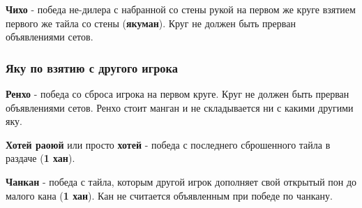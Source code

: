 \textbf{Чихо} - победа не-дилера с набранной со стены рукой на первом же круге взятием первого же тайла со стены (\textbf{якуман}). Круг не должен быть прерван объявлениями сетов.

\subsubsection{Яку по взятию с другого игрока}

\textbf{Ренхо} - победа со сброса игрока на первом круге. Круг не должен быть прерван объявлениями сетов. Ренхо стоит манган и не складывается ни с какими другими яку.

\textbf{Хотей раоюй} или просто \textbf{хотей} - победа с последнего сброшенного тайла в раздаче (\textbf{1 хан}).

\textbf{Чанкан} - победа с тайла, которым другой игрок дополняет свой открытый пон до малого кана (\textbf{1 хан}). Кан не считается объявленным при победе по чанкану.

